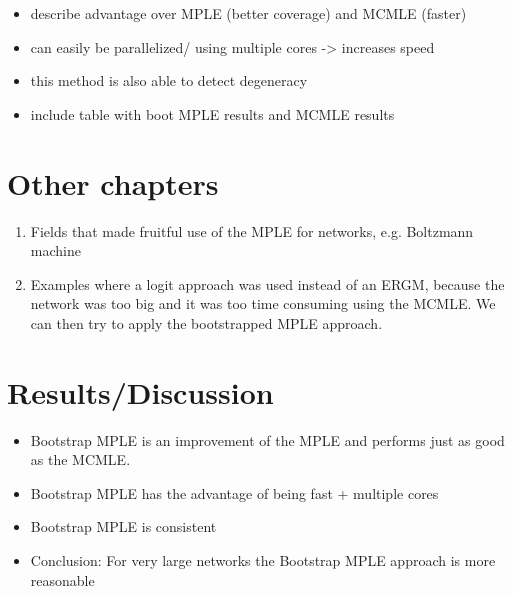 \documentclass[headsepline=true, abstracton]{scrartcl}
\begin{document}
\begin{itemize}

\item describe advantage over MPLE (better coverage) and MCMLE (faster)
\item can easily be parallelized/ using multiple cores -> increases speed
\item this method is also able to detect degeneracy
\item include table with boot MPLE results and MCMLE results
\end{itemize}


 \section*{Other chapters}
 
 \begin{enumerate}
 \item Fields that made fruitful use of the MPLE for networks, e.g. Boltzmann machine
 \item Examples where a logit approach was used instead of an ERGM, because the network was too big and it was too time consuming using the MCMLE. We can then try to apply the bootstrapped MPLE approach.
\end{enumerate}   
   


 \section*{Results/Discussion}
\begin{itemize}
  
 \item  Bootstrap MPLE is an improvement of the MPLE and performs just as good as the MCMLE. \\
\item Bootstrap MPLE has the advantage of being fast + multiple cores\\ 
\item Bootstrap MPLE is consistent\\
\item Conclusion: For very large networks the Bootstrap MPLE approach is more reasonable
   
\end{itemize}

   
\newpage


 

\end{document}
